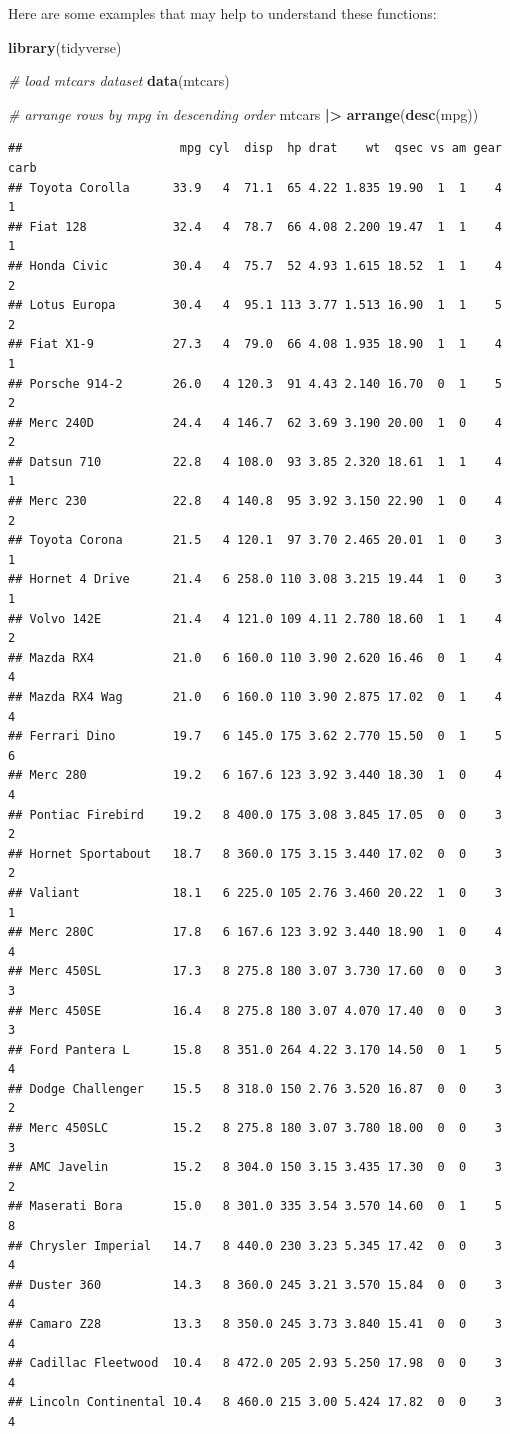 \documentclass[
  12pt,
  oneside]{book}
\newenvironment{Shaded}{\begin{snugshade}}{\end{snugshade}}
\newcommand{\CommentTok}[1]{\textcolor[rgb]{0.56,0.35,0.01}{\textit{#1}}}
\newcommand{\FunctionTok}[1]{\textcolor[rgb]{0.13,0.29,0.53}{\textbf{#1}}}
\newcommand{\NormalTok}[1]{#1}
\newcommand{\SpecialCharTok}[1]{\textcolor[rgb]{0.81,0.36,0.00}{\textbf{#1}}}
\begin{document}
Here are some examples that may help to understand these functions:

\begin{Shaded}
\begin{Highlighting}[]
\FunctionTok{library}\NormalTok{(tidyverse)}

\CommentTok{\# load mtcars dataset}
\FunctionTok{data}\NormalTok{(mtcars)}

\CommentTok{\# arrange rows by mpg in descending order}
\NormalTok{mtcars }\SpecialCharTok{|\textgreater{}} 
  \FunctionTok{arrange}\NormalTok{(}\FunctionTok{desc}\NormalTok{(mpg))}
\end{Highlighting}
\end{Shaded}

\begin{verbatim}
##                      mpg cyl  disp  hp drat    wt  qsec vs am gear carb
## Toyota Corolla      33.9   4  71.1  65 4.22 1.835 19.90  1  1    4    1
## Fiat 128            32.4   4  78.7  66 4.08 2.200 19.47  1  1    4    1
## Honda Civic         30.4   4  75.7  52 4.93 1.615 18.52  1  1    4    2
## Lotus Europa        30.4   4  95.1 113 3.77 1.513 16.90  1  1    5    2
## Fiat X1-9           27.3   4  79.0  66 4.08 1.935 18.90  1  1    4    1
## Porsche 914-2       26.0   4 120.3  91 4.43 2.140 16.70  0  1    5    2
## Merc 240D           24.4   4 146.7  62 3.69 3.190 20.00  1  0    4    2
## Datsun 710          22.8   4 108.0  93 3.85 2.320 18.61  1  1    4    1
## Merc 230            22.8   4 140.8  95 3.92 3.150 22.90  1  0    4    2
## Toyota Corona       21.5   4 120.1  97 3.70 2.465 20.01  1  0    3    1
## Hornet 4 Drive      21.4   6 258.0 110 3.08 3.215 19.44  1  0    3    1
## Volvo 142E          21.4   4 121.0 109 4.11 2.780 18.60  1  1    4    2
## Mazda RX4           21.0   6 160.0 110 3.90 2.620 16.46  0  1    4    4
## Mazda RX4 Wag       21.0   6 160.0 110 3.90 2.875 17.02  0  1    4    4
## Ferrari Dino        19.7   6 145.0 175 3.62 2.770 15.50  0  1    5    6
## Merc 280            19.2   6 167.6 123 3.92 3.440 18.30  1  0    4    4
## Pontiac Firebird    19.2   8 400.0 175 3.08 3.845 17.05  0  0    3    2
## Hornet Sportabout   18.7   8 360.0 175 3.15 3.440 17.02  0  0    3    2
## Valiant             18.1   6 225.0 105 2.76 3.460 20.22  1  0    3    1
## Merc 280C           17.8   6 167.6 123 3.92 3.440 18.90  1  0    4    4
## Merc 450SL          17.3   8 275.8 180 3.07 3.730 17.60  0  0    3    3
## Merc 450SE          16.4   8 275.8 180 3.07 4.070 17.40  0  0    3    3
## Ford Pantera L      15.8   8 351.0 264 4.22 3.170 14.50  0  1    5    4
## Dodge Challenger    15.5   8 318.0 150 2.76 3.520 16.87  0  0    3    2
## Merc 450SLC         15.2   8 275.8 180 3.07 3.780 18.00  0  0    3    3
## AMC Javelin         15.2   8 304.0 150 3.15 3.435 17.30  0  0    3    2
## Maserati Bora       15.0   8 301.0 335 3.54 3.570 14.60  0  1    5    8
## Chrysler Imperial   14.7   8 440.0 230 3.23 5.345 17.42  0  0    3    4
## Duster 360          14.3   8 360.0 245 3.21 3.570 15.84  0  0    3    4
## Camaro Z28          13.3   8 350.0 245 3.73 3.840 15.41  0  0    3    4
## Cadillac Fleetwood  10.4   8 472.0 205 2.93 5.250 17.98  0  0    3    4
## Lincoln Continental 10.4   8 460.0 215 3.00 5.424 17.82  0  0    3    4
\end{verbatim}
\end{document}
